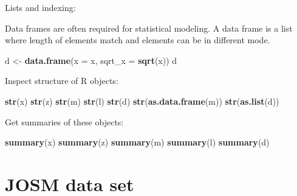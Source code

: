 \documentclass[12pt,]{book}
\newenvironment{Shaded}{\begin{snugshade}}{\end{snugshade}}
\newcommand{\DataTypeTok}[1]{\textcolor[rgb]{0.13,0.29,0.53}{#1}}
\newcommand{\DecValTok}[1]{\textcolor[rgb]{0.00,0.00,0.81}{#1}}
\newcommand{\KeywordTok}[1]{\textcolor[rgb]{0.13,0.29,0.53}{\textbf{#1}}}
\newcommand{\NormalTok}[1]{#1}
\newcommand{\OperatorTok}[1]{\textcolor[rgb]{0.81,0.36,0.00}{\textbf{#1}}}
\newcommand{\StringTok}[1]{\textcolor[rgb]{0.31,0.60,0.02}{#1}}
\begin{document}
Lists and indexing:

\begin{Shaded}
\end{Shaded}

Data frames are often required for statistical modeling.
A data frame is a list where length of elements match and elements
can be in different mode.

\begin{Shaded}
\begin{Highlighting}[]
\NormalTok{d <-}\StringTok{ }\KeywordTok{data.frame}\NormalTok{(}\DataTypeTok{x =}\NormalTok{ x, }\DataTypeTok{sqrt_x =} \KeywordTok{sqrt}\NormalTok{(x))}
\NormalTok{d}
\end{Highlighting}
\end{Shaded}

Inspect structure of R objects:

\begin{Shaded}
\begin{Highlighting}[]
\KeywordTok{str}\NormalTok{(x)}
\KeywordTok{str}\NormalTok{(z)}
\KeywordTok{str}\NormalTok{(m)}
\KeywordTok{str}\NormalTok{(l)}
\KeywordTok{str}\NormalTok{(d)}
\KeywordTok{str}\NormalTok{(}\KeywordTok{as.data.frame}\NormalTok{(m))}
\KeywordTok{str}\NormalTok{(}\KeywordTok{as.list}\NormalTok{(d))}
\end{Highlighting}
\end{Shaded}

Get summaries of these objects:

\begin{Shaded}
\begin{Highlighting}[]
\KeywordTok{summary}\NormalTok{(x)}
\KeywordTok{summary}\NormalTok{(z)}
\KeywordTok{summary}\NormalTok{(m)}
\KeywordTok{summary}\NormalTok{(l)}
\KeywordTok{summary}\NormalTok{(d)}
\end{Highlighting}
\end{Shaded}

\hypertarget{josm-data-set}{%
\section{JOSM data set}\label{josm-data-set}}
\end{document}
